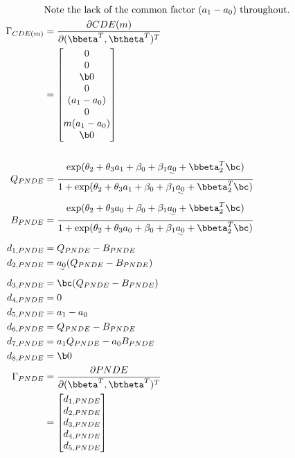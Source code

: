 \documentclass[10pt]{article}
\begin{document}
\begin{align*}
  &\text{Note the lack of the common factor $(a_{1} - a_{0})$ throughout.}\\
  \Gamma_{CDE(m)}
  &= \frac{\partial CDE(m)}{\partial (\bbeta^{T},\btheta^{T})^{T}}\\
  &=
    \begin{bmatrix}
      0\\
      0\\
      \b0\\
      0\\
      (a_{1} - a_{0})\\
      0\\
      m(a_{1} - a_{0})\\
      \b0\\
    \end{bmatrix}\\
  \\
  Q_{PNDE} &= \frac
             {    \exp(\theta_{2} + \theta_{3}a_{1} + \beta_{0} + \beta_{1}\uwave{a_{0}} + \bbeta_{2}^{T}\bc)}
             {1 + \exp(\theta_{2} + \theta_{3}a_{1} + \beta_{0} + \beta_{1}\uwave{a_{0}} + \bbeta_{2}^{T}\bc)}\\
  B_{PNDE} &= \frac
             {    \exp(\theta_{2} + \theta_{3}a_{0} + \beta_{0} + \beta_{1}\uwave{a_{0}} + \bbeta_{2}^{T}\bc)}
             {1 + \exp(\theta_{2} + \theta_{3}a_{0} + \beta_{0} + \beta_{1}\uwave{a_{0}} + \bbeta_{2}^{T}\bc)}\\
      d_{1,PNDE} &= Q_{PNDE} - B_{PNDE}\\
      d_{2,PNDE} &= \uwave{a_{0}} (Q_{PNDE} - B_{PNDE})\\
      d_{3,PNDE} &= \bc (Q_{PNDE} - B_{PNDE})\\
      d_{4,PNDE} &= 0\\
      d_{5,PNDE} &= a_{1} - a_{0}\\
      d_{6,PNDE} &= Q_{PNDE} - B_{PNDE}\\
      d_{7,PNDE} &= a_{1}Q_{PNDE} - a_{0}B_{PNDE}\\
      d_{8,PNDE} &= \b0\\
  \Gamma_{PNDE}
  &= \frac{\partial PNDE}{\partial (\bbeta^{T},\btheta^{T})^{T}}\\
  &= \begin{bmatrix}
      d_{1,PNDE}\\
      d_{2,PNDE}\\
      d_{3,PNDE}\\
      d_{4,PNDE}\\
      d_{5,PNDE}\\

\end{bmatrix}
\end{align*}
\end{document}
